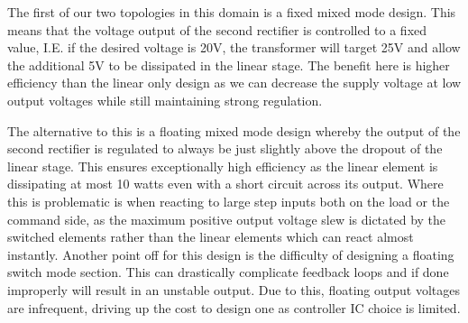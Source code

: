\documentclass{article}
\begin{document}
The first of our two topologies in this domain is a fixed mixed mode design. 
This means that the voltage output of the second rectifier is controlled to a 
fixed value, I.E. if the desired voltage is 20V, the transformer will target 25V 
and allow the additional 5V to be dissipated in the linear stage. The benefit 
here is higher efficiency than the linear only design as we can decrease the supply 
voltage at low output voltages while still maintaining strong regulation. 

The alternative to this is a floating mixed mode design whereby the output of the 
second rectifier is regulated to always be just slightly above the dropout of the 
linear stage. This ensures exceptionally high efficiency as the linear element is 
dissipating at most 10 watts even with a short circuit across its output. Where this 
is problematic is when reacting to large step inputs both on the load or the command 
side, as the maximum positive output voltage slew is dictated by the switched elements 
rather than the linear elements which can react almost instantly. Another point off 
for this design is the difficulty of designing a floating switch mode section. This 
can drastically complicate feedback loops and if done improperly will result in an 
unstable output. Due to this, floating output voltages are infrequent, driving up 
the cost to design one as controller IC choice is limited.
\end{document}

